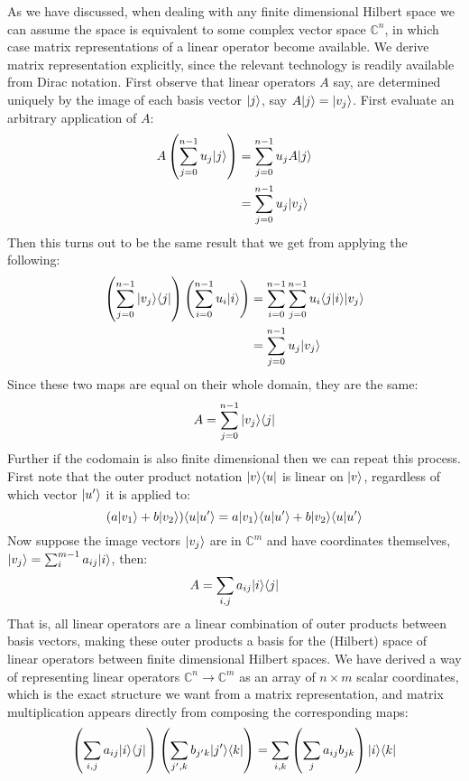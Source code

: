 As we have discussed, when dealing with any finite dimensional Hilbert space we can assume the space is equivalent to some complex vector space $\mathbb{C}^n$, in which case matrix representations of a linear operator become available. We derive matrix representation explicitly, since the relevant technology is readily available from Dirac notation. First observe that linear operators $A$ say, are determined uniquely by the image of each basis vector $| j \rangle$, say $A| j \rangle = | v_j \rangle$. First evaluate an arbitrary application of $A$:
\begin{align*}
A\left(\sum_{j=0}^{n-1}u_j| j \rangle\right)
&= \sum_{j=0}^{n-1}u_jA| j \rangle
\\&= \sum_{j=0}^{n-1}u_j| v_j \rangle
\end{align*}
Then this turns out to be the same result that we get from applying the following:
\begin{align*}
	\left(\sum_{j=0}^{n-1}| v_j \rangle\langle j |\right)\left(\sum_{i=0}^{n-1}u_i| i \rangle\right)
	&= \sum_{i=0}^{n-1}\sum_{j=0}^{n-1}u_i\langle j | i \rangle| v_j \rangle
	\\&= \sum_{j=0}^{n-1}u_j| v_j \rangle
\end{align*}
Since these two maps are equal on their whole domain, they are the same:
\[A = \sum_{j=0}^{n-1} | v_j \rangle\langle j |\]
Further if the codomain is also finite dimensional then we can repeat this process. First note that the outer product notation $| v \rangle\langle u |$ is linear on $| v \rangle$, regardless of which vector $| u' \rangle$ it is applied to:
\[(a| v_1 \rangle+b| v_2 \rangle)\langle u | u' \rangle = a| v_1 \rangle\langle u | u' \rangle+b| v_2 \rangle\langle u | u' \rangle\]
Now suppose the image vectors $| v_j \rangle$ are in $\mathbb{C}^m$ and have coordinates themselves, $| v_j \rangle = \sum_i^{m-1} a_{ij}| i \rangle$, then:
\begin{align*}
A = \sum_{i,j} a_{ij}| i \rangle\langle j |
\end{align*}
That is, all linear operators are a linear combination of outer products between basis vectors, making these outer products a basis for the (Hilbert) space of linear operators between finite dimensional Hilbert spaces. We have derived a way of representing linear operators $\mathbb{C}^n \to \mathbb{C}^m$ as an array of $n \times m$ scalar coordinates, which is the exact structure we want from a matrix representation, and matrix multiplication appears directly from composing the corresponding maps:
\[\left(\sum_{i,j}a_{ij}| i \rangle\langle j |\right)\left(\sum_{j',k}b_{j'k}| j' \rangle\langle k |\right) = \sum_{i,k}\left(\sum_j a_{ij}b_{jk}\right)| i \rangle\langle k |\]

